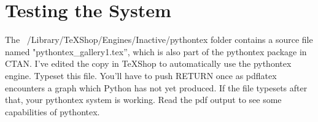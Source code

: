 \documentclass[11pt, oneside]{amsart}
\begin{document}
\section{Testing the System}
The ~/Library/TeXShop/Engines/Inactive/pythontex folder contains a source file named "pythontex\_gallery1.tex'', which is also part of the pythontex package in CTAN. I've edited
the copy in TeXShop to automatically use the pythontex engine. Typeset this file. You'll
have to push RETURN once as pdflatex encounters a graph which Python has not yet produced. If the file
typesets after that, your pythontex system is working. Read the pdf output to see some capabilities of pythontex.
\end{document}
